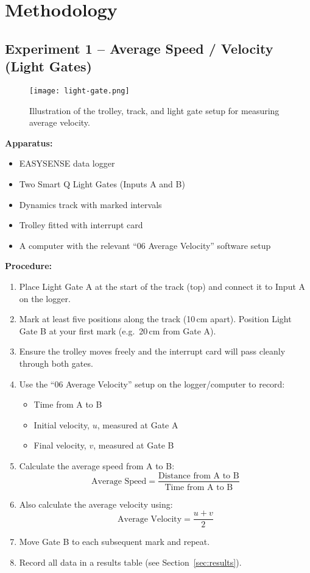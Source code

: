 \documentclass{tufte-handout}
\begin{document}
\section{Methodology}

\subsection{Experiment 1 -- Average Speed / Velocity (Light Gates)}
\begin{figure}[ht]
\centering
\texttt{[image: light-gate.png]}
\caption{Illustration of the trolley, track, and light gate setup for measuring average velocity.}
\label{fig:avgvelocitysetup}
\end{figure}

\noindent\textbf{Apparatus:}
\begin{itemize}
  \item EASYSENSE data logger
  \item Two Smart Q Light Gates (Inputs A and B)
  \item Dynamics track with marked intervals
  \item Trolley fitted with interrupt card
  \item A computer with the relevant “06 Average Velocity” software setup
\end{itemize}

\noindent\textbf{Procedure:}
\begin{enumerate}
  \item Place Light Gate A at the start of the track (top) and connect it to Input A on the logger.
  \item Mark at least five positions along the track (10\,cm apart). Position Light Gate B at your first mark (e.g.\ 20\,cm from Gate A).
  \item Ensure the trolley moves freely and the interrupt card will pass cleanly through both gates.
  \item Use the “06 Average Velocity” setup on the logger/computer to record:
  \begin{itemize}
    \item Time from A to B
    \item Initial velocity, $u$, measured at Gate A
    \item Final velocity, $v$, measured at Gate B
  \end{itemize}
  \item Calculate the average speed from A to B:
  \[
    \text{Average Speed} = \frac{\text{Distance from A to B}}{\text{Time from A to B}}
  \]
  \item Also calculate the average velocity using:
  \[
    \text{Average Velocity} = \frac{u + v}{2}
  \]
  \item Move Gate B to each subsequent mark and repeat.
  \item Record all data in a results table (see Section~\ref{sec:results}).
\end{enumerate}
\end{document}
